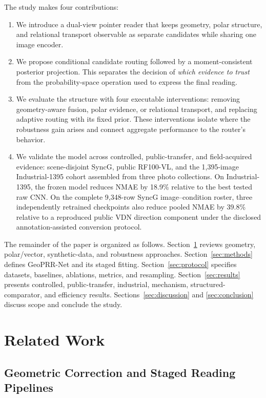 \documentclass[electronics,article,submit,oneauthor]{Definitions/mdpi}
\newcommand{\modelname}{GeoPRR-Net\xspace}
\begin{document}
The study makes four contributions:
\begin{enumerate}[leftmargin=*]
    \item We introduce a dual-view pointer reader that keeps geometry, polar structure, and relational transport observable as separate candidates while sharing one image encoder.
    \item We propose conditional candidate routing followed by a moment-consistent posterior projection. This separates the decision of \emph{which evidence to trust} from the probability-space operation used to express the final reading.
    \item We evaluate the structure with four executable interventions: removing geometry-aware fusion, polar evidence, or relational transport, and replacing adaptive routing with its fixed prior. These interventions isolate where the robustness gain arises and connect aggregate performance to the router's behavior.
    \item We validate the model across controlled, public-transfer, and field-acquired evidence: scene-disjoint SyncG, public RF100-VL, and the 1,395-image Industrial-1395 cohort assembled from three photo collections. On Industrial-1395, the frozen model reduces NMAE by 18.9\% relative to the best tested raw CNN. On the complete 9,348-row SyncG image--condition roster, three independently retrained checkpoints also reduce pooled NMAE by 39.8\% relative to a reproduced public VDN direction component under the disclosed annotation-assisted conversion protocol.
\end{enumerate}

The remainder of the paper is organized as follows. Section~\ref{sec:related} reviews geometry, polar/vector, synthetic-data, and robustness approaches. Section~\ref{sec:methods} defines \modelname and its staged fitting. Section~\ref{sec:protocol} specifies datasets, baselines, ablations, metrics, and resampling. Section~\ref{sec:results} presents controlled, public-transfer, industrial, mechanism, structured-comparator, and efficiency results. Sections~\ref{sec:discussion} and \ref{sec:conclusion} discuss scope and conclude the study.

\section{Related Work}
\label{sec:related}

\subsection{Geometric Correction and Staged Reading Pipelines}
\end{document}
